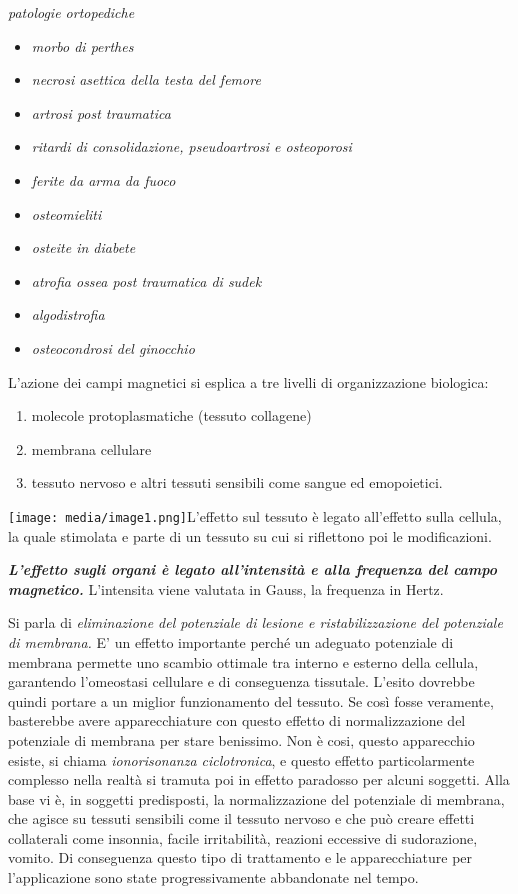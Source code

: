 \documentclass[]{article}
\begin{document}
\emph{\emph{patologie ortopediche}}

\begin{itemize}
\item
  \emph{morbo di perthes}
\item
  \emph{necrosi asettica della testa del femore}
\item
  \emph{artrosi post traumatica}
\item
  \emph{ritardi di consolidazione, pseudoartrosi e osteoporosi}
\item
  \emph{ferite da arma da fuoco}
\item
  \emph{osteomieliti}
\item
  \emph{osteite in diabete}
\item
  \emph{atrofia ossea post traumatica di sudek}
\item
  \emph{algodistrofia}
\item
  \emph{osteocondrosi del ginocchio}
\end{itemize}

L'azione dei campi magnetici si esplica a tre livelli di organizzazione
biologica:

\begin{enumerate}
\def\labelenumi{\arabic{enumi}.}
\item
  molecole protoplasmatiche (tessuto collagene)
\item
  membrana cellulare
\item
  tessuto nervoso e altri tessuti sensibili come sangue ed emopoietici.
\end{enumerate}

\texttt{[image: media/image1.png]}L'effetto
sul tessuto è legato all'effetto sulla cellula, la quale stimolata e
parte di un tessuto su cui si riflettono poi le modificazioni.

\textbf{\emph{L'effetto sugli organi è legato all'intensità e alla
frequenza del campo magnetico.}} L'intensita viene valutata in Gauss, la
frequenza in Hertz.

Si parla di \emph{\emph{eliminazione del potenziale di lesione e
ristabilizzazione del potenziale di membrana.}} E' un effetto importante
perché un adeguato potenziale di membrana permette uno scambio ottimale
tra interno e esterno della cellula, garantendo l'omeostasi cellulare e
di conseguenza tissutale. L'esito dovrebbe quindi portare a un miglior
funzionamento del tessuto. Se così fosse veramente, basterebbe avere
apparecchiature con questo effetto di normalizzazione del potenziale di
membrana per stare benissimo. Non è cosi, questo apparecchio esiste, si
chiama \emph{ionorisonanza ciclotronica}, e questo effetto
particolarmente complesso nella realtà si tramuta poi in effetto
paradosso per alcuni soggetti. Alla base vi è, in soggetti predisposti,
la normalizzazione del potenziale di membrana, che agisce su tessuti
sensibili come il tessuto nervoso e che può creare effetti collaterali
come insonnia, facile irritabilità, reazioni eccessive di sudorazione,
vomito. Di conseguenza questo tipo di trattamento e le apparecchiature
per l'applicazione sono state progressivamente abbandonate nel tempo.
\end{document}

